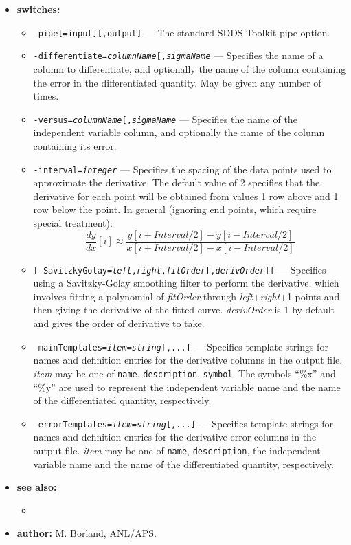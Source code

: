 \begin{itemize}
\item {\bf switches:}
    \begin{itemize}
    \item {\tt -pipe[=input][,output]} --- The standard SDDS Toolkit pipe option.
    \item {\tt -differentiate={\em columnName}[,{\em sigmaName}} --- Specifies the name
        of a column to differentiate, and optionally the name of the column containing
        the error in the differentiated quantity.  May be given any number of times.
    \item {\tt -versus={\em columnName}[,{\em sigmaName}} --- Specifies the name
        of the independent variable column, and optionally the name of the column
        containing its error.
    \item {\tt -interval={\em integer}} --- Specifies the spacing of the data points
        used to approximate the derivative.  The default value of 2 specifies that
        the derivative for each point will be obtained from values 1 row above and
        1 row below the point.  In general (ignoring end points, which require
        special treatment):
        \[
        \frac{d y}{d x}[i] \approx \frac{y[i+Interval/2] - y[i-Interval/2]}{x[i+Interval/2] - x[i-Interval/2]}
        \]
    \item {\tt [-SavitzkyGolay={\em left},{\em right},{\em fitOrder}[,{\em derivOrder}]]} --- 
        Specifies using a Savitzky-Golay smoothing filter to perform the derivative,
        which involves fitting a polynomial of {\em fitOrder} through {\em left}+{\em right}+1
        points and then giving the derivative of the fitted curve.  {\em derivOrder} is 1
        by default and gives the order of derivative to take.
    \item {\tt -mainTemplates={\em item}={\em string}[,...]} --- Specifies template
        strings for  names and definition entries for the derivative columns
         in the output file.  {\em item} may be one of {\tt name}, {\tt description},
        {\tt symbol}.  The symbols ``\%x'' and ``\%y'' are used to represent
        the independent variable name and the name of the differentiated quantity, respectively.
    \item {\tt -errorTemplates={\em item}={\em string}[,...]} --- Specifies template
        strings for  names and definition entries for the derivative error columns
        in the output file.  {\em item} may be one of {\tt name}, {\tt description},
        the independent variable name and the name of the differentiated quantity, respectively.
    \end{itemize}
\item {\bf see also:}
    \begin{itemize}
    \item {}
    \end{itemize}
\item {\bf author:} M. Borland, ANL/APS.
\end{itemize}


